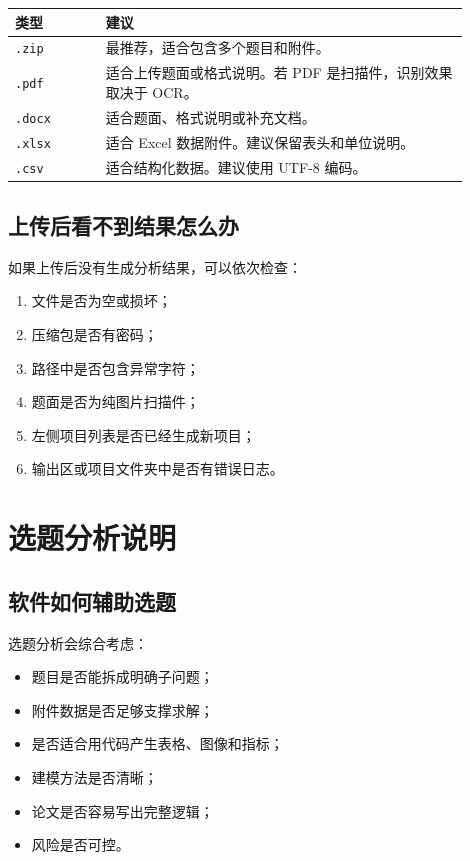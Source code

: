 \documentclass[UTF8,a4paper,12pt]{ctexart}
\begin{document}
\begin{longtable}{p{0.18\linewidth}p{0.72\linewidth}}
\toprule
类型 & 建议 \\
\midrule
\texttt{.zip} & 最推荐，适合包含多个题目和附件。 \\
\texttt{.pdf} & 适合上传题面或格式说明。若 PDF 是扫描件，识别效果取决于 OCR。 \\
\texttt{.docx} & 适合题面、格式说明或补充文档。 \\
\texttt{.xlsx} & 适合 Excel 数据附件。建议保留表头和单位说明。 \\
\texttt{.csv} & 适合结构化数据。建议使用 UTF-8 编码。 \\
\bottomrule
\end{longtable}

\subsection{上传后看不到结果怎么办}

如果上传后没有生成分析结果，可以依次检查：

\begin{enumerate}
  \item 文件是否为空或损坏；
  \item 压缩包是否有密码；
  \item 路径中是否包含异常字符；
  \item 题面是否为纯图片扫描件；
  \item 左侧项目列表是否已经生成新项目；
  \item 输出区或项目文件夹中是否有错误日志。
\end{enumerate}

\section{选题分析说明}

\subsection{软件如何辅助选题}

选题分析会综合考虑：

\begin{itemize}
  \item 题目是否能拆成明确子问题；
  \item 附件数据是否足够支撑求解；
  \item 是否适合用代码产生表格、图像和指标；
  \item 建模方法是否清晰；
  \item 论文是否容易写出完整逻辑；
  \item 风险是否可控。
\end{itemize}
\end{document}

